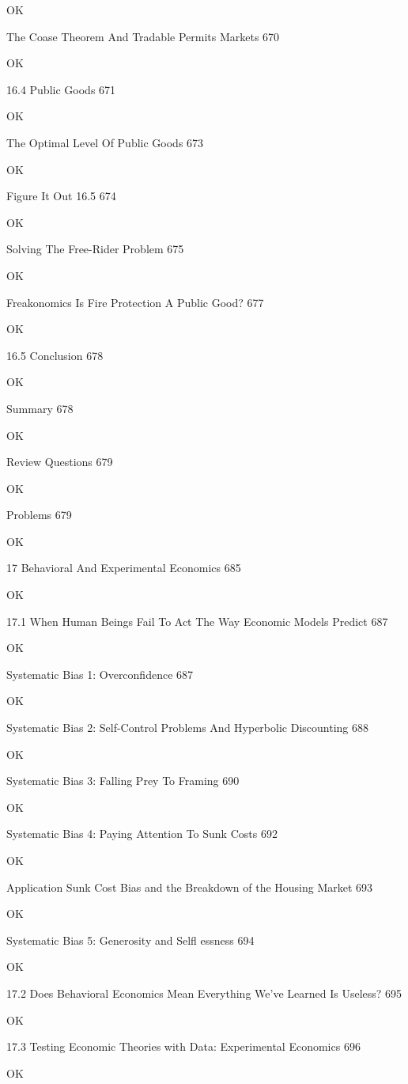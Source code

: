 OK

The Coase Theorem And Tradable Permits Markets 670

OK

16.4 Public Goods 671

OK

The Optimal Level Of Public Goods 673

OK

Figure It Out 16.5 674

OK

Solving The Free-Rider Problem 675

OK

Freakonomics Is Fire Protection A Public Good? 677

OK

16.5 Conclusion 678

OK

Summary 678

OK

Review Questions 679

OK

Problems 679

OK

17 Behavioral And Experimental Economics 685

OK

17.1 When Human Beings Fail To Act The Way Economic Models Predict 687

OK

Systematic Bias 1: Overconfidence 687

OK

Systematic Bias 2: Self-Control Problems And Hyperbolic Discounting 688

OK

Systematic Bias 3: Falling Prey To Framing 690

OK

Systematic Bias 4: Paying Attention To Sunk Costs 692

OK

Application Sunk Cost Bias and the Breakdown of the Housing Market 693

OK

Systematic Bias 5: Generosity and Selfl essness 694

OK

17.2 Does Behavioral Economics Mean Everything We've Learned Is Useless? 695

OK

17.3 Testing Economic Theories with Data: Experimental Economics 696

OK

